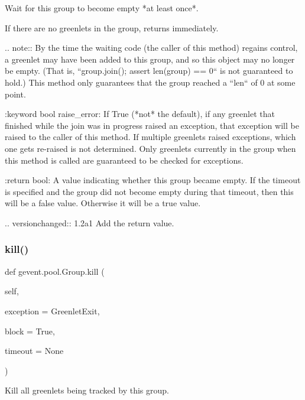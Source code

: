 \begin{DoxyVerb}Wait for this group to become empty *at least once*.

If there are no greenlets in the group, returns immediately.

.. note:: By the time the waiting code (the caller of this
   method) regains control, a greenlet may have been added to
   this group, and so this object may no longer be empty. (That
   is, ``group.join(); assert len(group) == 0`` is not
   guaranteed to hold.) This method only guarantees that the group
   reached a ``len`` of 0 at some point.

:keyword bool raise_error: If True (*not* the default), if any
    greenlet that finished while the join was in progress raised
    an exception, that exception will be raised to the caller of
    this method. If multiple greenlets raised exceptions, which
    one gets re-raised is not determined. Only greenlets currently
    in the group when this method is called are guaranteed to
    be checked for exceptions.

:return bool: A value indicating whether this group became empty.
   If the timeout is specified and the group did not become empty
   during that timeout, then this will be a false value. Otherwise
   it will be a true value.

.. versionchanged:: 1.2a1
   Add the return value.
\end{DoxyVerb}
 \mbox{\label{classgevent_1_1pool_1_1_group_ada2edb0aaef544992fa1c967e1d2094f}} 
\subsubsection{\texorpdfstring{kill()}{kill()}}
{\footnotesize\ttfamily def gevent.\+pool.\+Group.\+kill (\begin{DoxyParamCaption}\item[{}]{self,  }\item[{}]{exception = {\ttfamily GreenletExit},  }\item[{}]{block = {\ttfamily True},  }\item[{}]{timeout = {\ttfamily None} }\end{DoxyParamCaption})}

\begin{DoxyVerb}Kill all greenlets being tracked by this group.
\end{DoxyVerb}
 \mbox{\label{classgevent_1_1pool_1_1_group_a8aaf4090368477a74d27d866cd1e0a9b}} 
